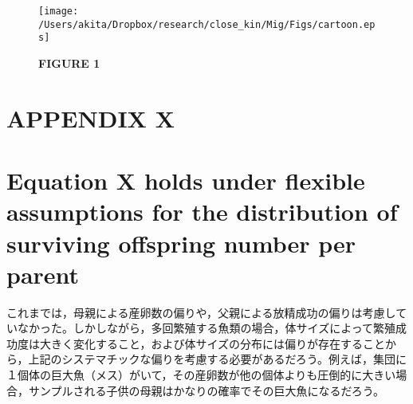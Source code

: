 \documentclass[12pt, English]{article}
\begin{document}
\begin{spacing}{1.9}
\newcommand{\figcapsg}{Violin plots showing the distribution of relative bias of $N_{\rm e}/N$ (denoted in Eq.~\ref{NeN_wang}) for various sample sizes. Filled circles represent the mean values. The sample numbers of parents and offspring are identical (i.e., $n=n_{\rm P} = n_{\rm O}$) and indicated in the legend. For demonstration purposes, the distribution is truncated, although the mean values are calculated including the truncated values. (a) $N=2{,}000$, (b) $N=20{,}000$.}

\begin{figure}[!h]
	\begin{center}
		\texttt{[image: /Users/akita/Dropbox/research/close\_kin/Mig/Figs/cartoon.eps]}
		\caption{{\bf FIGURE 1} \figcapa{}}
		\label{cartoon}
	\end{center}
\end{figure}


\clearpage

\section*{APPENDIX X}
\setcounter{equation}{0}

\section*{Equation X holds under flexible assumptions for the distribution of surviving offspring number per parent}

\renewcommand{\theequation}{A\arabic{equation}}

これまでは，母親による産卵数の偏りや，父親による放精成功の偏りは考慮していなかった。しかしながら，多回繁殖する魚類の場合，体サイズによって繁殖成功度は大きく変化すること，および体サイズの分布には偏りが存在することから，上記のシステマチックな偏りを考慮する必要があるだろう。例えば，集団に１個体の巨大魚（メス）がいて，その産卵数が他の個体よりも圧倒的に大きい場合，サンプルされる子供の母親はかなりの確率でその巨大魚になるだろう。


\end{spacing}
\end{document}
